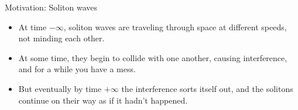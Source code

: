\documentclass[aspectratio=169, serif]{beamer}
\begin{document}
\begin{frame}{Motivation: Soliton waves}


\begin{itemize}
\item At time $-\infty$, %
soliton waves are traveling through space at different speeds, not minding each other.
\item 
At some time, they begin to 
collide 
with one another, causing interference, and for a while you have a mess.  
\item 
But eventually by time $+\infty$ the interference sorts itself out, and the solitons continue on their way as if it hadn't happened.  
\end{itemize}

  \vspace{5mm}



        
    \end{frame}
\end{document}
